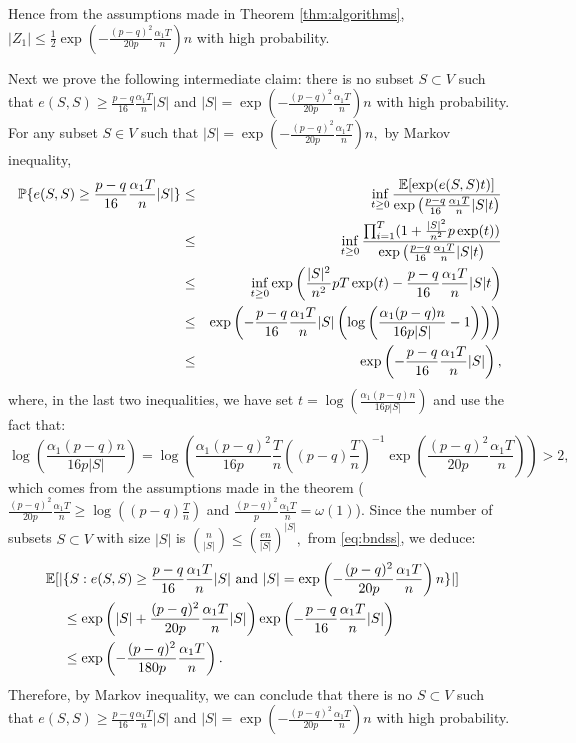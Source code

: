 Hence from the assumptions made in Theorem \ref{thm:algorithms}, $| Z_1|\le  \frac{1}{2} \exp \left(-\frac{(p-q)^2 }{20p } \frac{\alpha_1 T}{n}\right)n$ with high probability. 
    
Next we prove the following intermediate claim: there is no subset
$S\subset V$ such that $e(S,S) \ge \frac{p-q}{16}\frac{\alpha_1
  T}{n}|S|$ and $|S|= \exp \left(-\frac{(p-q)^2 }{20p } \frac{\alpha_1
    T}{n}\right) n$ with high probability. For any subset $S \in V$
such that $|S| =  \exp \left(-\frac{(p-q)^2 }{20p } \frac{\alpha_1
    T}{n}\right) n,$ by Markov inequality,
\begin{eqnarray} 
\mathbb{P} \{ e(S,S) \ge \frac{p-q}{16}\frac{\alpha_1 T}{n}|S| \} &\le&\inf_{t\ge  0} \frac{ \mathbb{E}[ \exp (e(S,S)t) ]  }{ \exp \left( \frac{p-q}{16}
  \frac{\alpha_1 T}{n} |S|t \right) } \cr
&\le&  \inf_{t\ge 0} \frac{ \prod_{i=1}^T ( 1+\frac{|S|^2}{n^2} p \exp(t) )  }{ \exp\left( \frac{p-q}{16}  \frac{\alpha_1 T}{n} |S| t \right) } \cr
&\le & \inf_{t\ge 0} \exp \left( \frac{|S|^2}{n^2}pT \exp (t) -   \frac{p-q}{16}
  \frac{\alpha_1 T}{n} |S| t  \right) \cr
&\le &  \exp \left(   -   \frac{p-q}{16}
  \frac{\alpha_1 T}{n} |S|\left( \log \left(\frac{\alpha_1 (p-q) n}{16  p |S|}-1
  \right)  \right) \right)\cr 
&\le& \exp \left(   -   \frac{p-q}{16}
  \frac{\alpha_1 T}{n} |S| \right),\label{eq:bndss}
\end{eqnarray}
where, in the last two inequalities, we have set $t= \log \left( \frac{\alpha_1 (p-q) n}{16 p |S|} \right)$ and use the fact that: 
$$\log \left(  \frac{\alpha_1 (p-q) n}{16 p |S|} \right) = \log \left(
  \frac{\alpha_1 (p-q)^2 }{16 p }\frac{T}{n} \left((p-q)\frac{T}{n} \right)^{-1} \exp\left(
    \frac{(p-q)^2}{20p}\frac{\alpha_1 T}{n}\right) \right) >2,$$
which comes from the assumptions made in the theorem ($\frac{(p-q)^2}{20p}\frac{\alpha_1 T}{n} \ge \log(
(p-q)\frac{T}{n})$ and $\frac{(p-q)^2}{p}\frac{\alpha_1 T}{n} = \omega(1)$). 
Since the number of subsets $S \subset V$ with size $|S|$ is
${{n}\choose{|S|}} \le (\frac{e n}{|S|})^{|S|} ,$ from \eqref{eq:bndss}, we deduce:
\begin{align*} \mathbb{E}[|& \{S : e(S,S) \ge \frac{p-q}{16}\frac{\alpha_1 T}{n}|S|~\mbox{and}~|S|= \exp \left(-\frac{(p-q)^2 }{20p } \frac{\alpha_1
    T}{n}\right) n \} |] \cr 
&\le \exp\left(|S| + \frac{(p-q)^2 }{20p } \frac{\alpha_1
    T}{n}|S| \right) \exp\left( -\frac{p-q}{16} \frac{\alpha_1 T}{n} |S|
\right) \cr
&\le \exp\left(-\frac{(p-q)^2 }{180p } \frac{\alpha_1  T}{n}\right).\end{align*}
Therefore, by Markov inequality, we can conclude that there is no $S \subset V$ such that
$e(S,S) \ge \frac{p-q}{16}\frac{\alpha_1 T}{n}|S|$ and $|S|= \exp \left(-\frac{(p-q)^2 }{20p } \frac{\alpha_1
    T}{n}\right) n$ with high probability.

